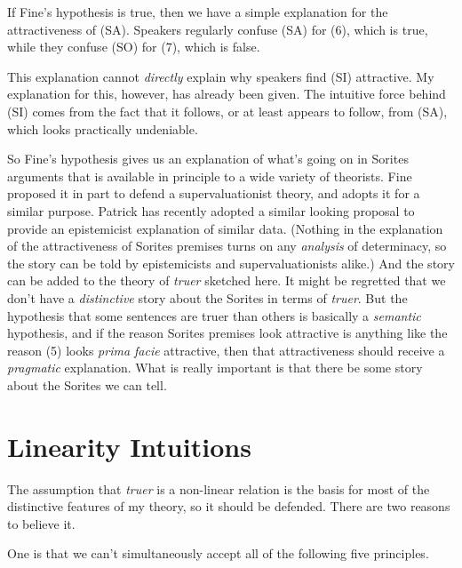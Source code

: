 If Fine's hypothesis is true, then we have a simple explanation for the attractiveness of (SA). Speakers regularly confuse (SA) for (6), which is true, while they confuse (SO) for (7), which is false.


\noindent This explanation cannot \textit{directly} explain why speakers find (SI) attractive. My explanation for this, however, has already been given. The intuitive force behind (SI) comes from the fact that it follows, or at least appears to follow, from (SA), which looks practically undeniable.

So Fine's hypothesis gives us an explanation of what's going on in Sorites arguments that is available in principle to a wide variety of theorists. Fine proposed it in part to defend a supervaluationist theory, and \citet{Keefe2000} adopts it for a similar purpose. Patrick \citet{Greenough2003} has recently adopted a similar looking proposal to provide an epistemicist explanation of similar data. (Nothing in the explanation of the attractiveness of Sorites premises turns on any \textit{analysis} of determinacy, so the story can be told by epistemicists and supervaluationists alike.) And the story can be added to the theory of \textit{truer} sketched here. It might be regretted that we don't have a \textit{distinctive} story about the Sorites in terms of \textit{truer}. But the hypothesis that some sentences are truer than others is basically a \textit{semantic} hypothesis, and if the reason Sorites premises look attractive is anything like the reason (5) looks \textit{prima facie} attractive, then that attractiveness should receive a \textit{pragmatic} explanation.  What is really important is that there be some story about the Sorites we can tell.

\section{Linearity Intuitions}
The assumption that \textit{truer} is a non-linear relation is the basis for most of the distinctive features of my theory, so it should be defended. There are two reasons to believe it.

One is that we can't simultaneously accept all of the following five principles. 

